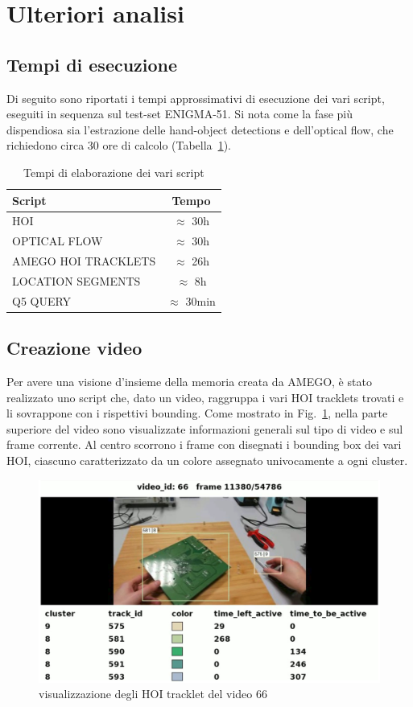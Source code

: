 \section{Ulteriori analisi}
\subsection*{Tempi di esecuzione}

Di seguito sono riportati i tempi approssimativi di esecuzione dei vari script, eseguiti in sequenza sul test-set ENIGMA-51.
Si nota come la fase più dispendiosa sia l'estrazione delle hand-object detections e dell'optical flow, che richiedono circa 30 ore di calcolo (Tabella~\ref{tab:tempi}).

\begin{table}[ht]
    \centering
    \caption{Tempi di elaborazione dei vari script}
    \begin{tabular}{|l|c|}
        \hline
        \textbf{Script} & \textbf{Tempo} \\
        \hline
        HOI & $\approx$ 30h \\
        OPTICAL FLOW & $\approx$ 30h \\
        AMEGO HOI TRACKLETS & $\approx$ 26h \\
        LOCATION SEGMENTS & $\approx$ 8h \\
        Q5 QUERY & $\approx$ 30min \\
        \hline
    \end{tabular}
    \label{tab:tempi}
\end{table}

\subsection*{Creazione video}

Per avere una visione d'insieme della memoria creata da AMEGO, è stato realizzato uno script che, dato un video, raggruppa i vari HOI tracklets trovati e li sovrappone con i rispettivi bounding.
Come mostrato in Fig.~\ref{fig:amego_video}, nella parte superiore del video sono visualizzate informazioni generali sul tipo di video e sul frame corrente. Al centro scorrono i frame con disegnati i bounding box dei vari HOI, ciascuno caratterizzato da un colore assegnato univocamente a ogni cluster.

\begin{figure}[ht]
    \centering
    \includegraphics[width=0.8\linewidth]{Images/amego_video.jpg}
    \caption{visualizzazione degli HOI tracklet del video 66 }
    \label{fig:amego_video}
\end{figure}

